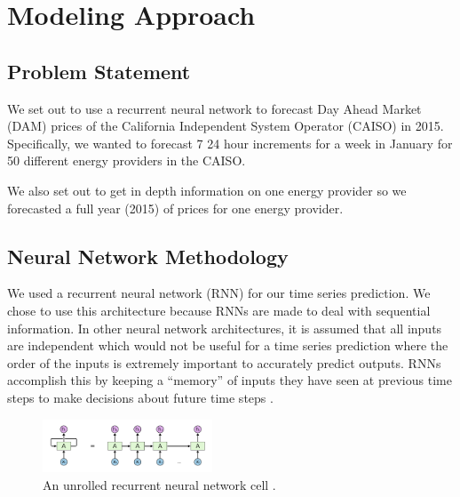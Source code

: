 \documentclass[sigconf]{acmart}
\begin{document}

\section{Modeling Approach}
\label{sec:approach}

\subsection{Problem Statement}
We set out to use a recurrent neural network to forecast Day Ahead Market (DAM) prices of the California Independent System Operator (CAISO)  in 2015. Specifically, we wanted to forecast 7 24 hour increments for a week in January for 50 different energy providers in the CAISO. 

We also set out to get in depth information on one energy provider so we forecasted a full year (2015) of prices for one energy provider.

\subsection{Neural Network Methodology}
We used a recurrent neural network (RNN) for our time series prediction. We chose to use this architecture because RNNs are made to deal with sequential information. In other neural network architectures, it is assumed that all inputs are independent which would not be useful for a time series prediction where the order of the inputs is extremely important to accurately predict outputs. RNNs accomplish this by keeping a “memory” of inputs they have seen at previous time steps to make decisions about future time steps \cite{Dasgupta2018}.  

\begin{figure}[h]
\includegraphics[width=0.45\textwidth]{rnn.png}
\caption{An unrolled recurrent neural network cell \cite{Dasgupta2018}.}
\label{fig:rnn}
\end{figure}
\end{document}
